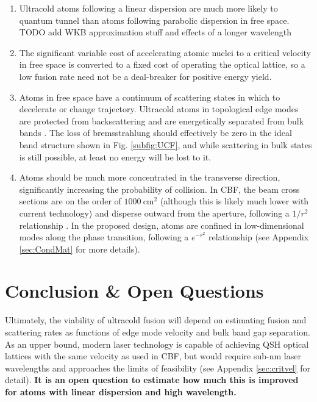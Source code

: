\documentclass[onecolumn,
               superscriptaddress,
               floatfix,
               longbibliography, 
               showkeys,apl]{revtex4-2}
\begin{document}
\begin{enumerate}
  \item Ultracold atoms following a linear dispersion are much more likely to quantum tunnel than atoms following parabolic dispersion in free space. TODO add WKB approximation stuff and effects of a longer wavelength
  \item The significant variable cost of accelerating atomic nuclei to a critical velocity in free space is converted to a fixed cost of operating the optical lattice, so a low fusion rate need not be a deal-breaker for positive energy yield.
  \item  Atoms in free space have a continuum of scattering states in which to decelerate or change trajectory. Ultracold atoms in topological edge modes are protected from backscattering and are energetically separated from bulk bands \cite{RevModPhys.83.1057}. The loss of bremsstrahlung should effectively be zero in the ideal band structure shown in Fig. \ref{subfig:UCF}, and while scattering in bulk states is still possible, at least no energy will be lost to it. 
  \item Atoms should be much more concentrated in the transverse direction, significantly increasing the probability of collision. In CBF, the beam cross sections are on the order of $1000~\text{cm}^2$ (although this is likely much lower with current technology) and disperse outward from the aperture, following a $1/r^2$ relationship \cite{blewett197xcbf}. In the proposed design, atoms are confined in low-dimensional modes along the phase transition, following a $e^{-r^2}$ relationship (see Appendix \ref{sec:CondMat} for more details).
\end{enumerate}


\section{Conclusion \& Open Questions}\label{sec:conclusion}

Ultimately, the viability of ultracold fusion will depend on estimating fusion and scattering rates as functions of edge mode velocity and bulk band gap separation. As an upper bound, modern laser technology is capable of achieving QSH optical lattices with the same velocity as used in CBF, but would require sub-nm laser wavelengths and approaches the limits of feasibility (see Appendix \ref{sec:critvel} for detail). \textbf{It is an open question to estimate how much this is improved for atoms with linear dispersion and high wavelength.}
\end{document}

